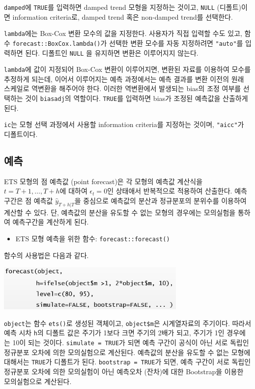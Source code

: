 \documentclass[
]{book}
\providecommand{\tightlist}{%
  \setlength{\itemsep}{0pt}\setlength{\parskip}{0pt}}
\begin{document}
\texttt{damped}에 \texttt{TRUE}를 입력하면 damped trend 모형을 지정하는 것이고, \texttt{NULL} (디폴트)이면 information criteria로, damped trend 혹은 non-damped trend를 선택한다.

\texttt{lambda}에는 Box-Cox 변환 모수의 값을 지정한다. 사용자가 직접 입력할 수도 있고, 함수 \texttt{forecast::BoxCox.lambda()}가 선택한 변환 모수를 자동 지정하려면 \texttt{"auto"}를 입력하면 된다. 디폴트인 \texttt{NULL} 을 유지하면 변환은 이루어지지 않는다.

\texttt{lambda}에 값이 지정되어 Box-Cox 변환이 이루어지면, 변환된 자료를 이용하여 모수를 추정하게 되는데, 이어서 이루어지는 예측 과정에서는 예측 결과를 변환 이전의 원래 스케일로 역변환을 해주어야 한다. 이러한 역변환에서 발생되는 bias의 조정 여부를 선택하는 것이 \texttt{biasadj}의 역할이다. \texttt{TRUE}를 입력하면 bias가 조정된 예측값을 산출하게 된다.

\texttt{ic}는 모형 선택 과정에서 사용할 information criteria를 지정하는 것이며, \texttt{"aicc"}가 디폴트이다.

\hypertarget{uxc608uxce21}{%
\subsection{예측}\label{uxc608uxce21}}

ETS 모형의 점 예측값 (point forecast)은 각 모형의 예측값 계산식을 \(t=T+1, \ldots, T+h\)에 대하여 \(\epsilon_{t}=0\)인 상태애서 반복적으로 적용하여 산출한다. 예측 구간은 점 예측값 \(\hat{y}_{T+h|T}\)을 중심으로 예측값의 분산과 정규분포의 분위수를 이용하여 계산할 수 있다. 단, 예측값의 분산을 유도할 수 없는 모형의 경우에는 모의실험을 통하여 예측구간을 계산하게 된다.

\begin{itemize}
\tightlist
\item
  ETS 모형 예측을 위한 함수: \texttt{forecast::forecast()}
\end{itemize}

함수의 사용법은 다음과 같다.

\includegraphics[width=3.64583in,height=\textheight]{Figures/forecast.PNG}

\texttt{object}는 함수 \texttt{ets()}로 생성된 객체이고, \texttt{object\$m}은 시계열자료의 주기이다. 따라서 예측 시차 \texttt{h}의 디폴트 값은 주기가 1보다 크면 주기의 2배가 되고, 주기가 1인 경우에는 10이 되는 것이다. \texttt{simulate\ =\ TRUE}가 되면 예측 구간이 공식이 아닌 서로 독립인 정규분포 오차에 의한 모의실험으로 계산된다. 예측값의 분산을 유도할 수 없는 모형에 대해서는 \texttt{TRUE}가 디폴트가 된다. \texttt{bootstrap\ =\ TRUE}가 되면, 예측 구간이 서로 독립인 정규분포 오차에 의한 모의실험이 아닌 예측오차 (잔차)에 대한 Bootstrap을 이용한 모의실험으로 계산된다.
\end{document}

